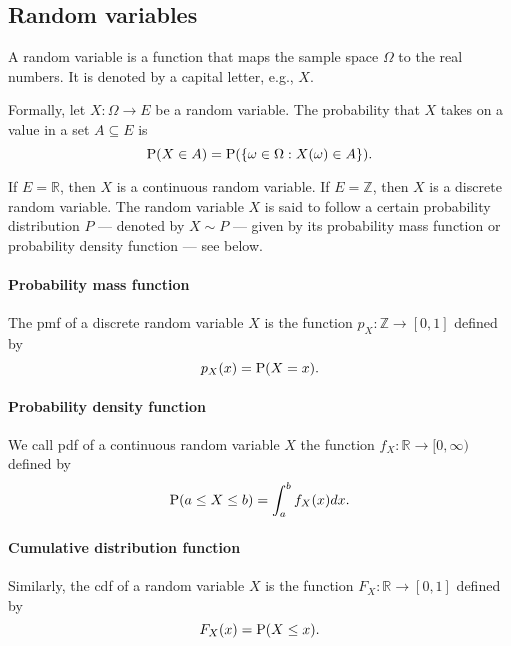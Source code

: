 \subsection{Random variables}

A random variable is a function that maps the sample space $\Omega$ to the real
numbers.  It is denoted by a capital letter, e.g., $X$.

Formally, let $X : \Omega \rightarrow E$ be a random variable.  The
probability that $X$ takes on a value in a set $A \subseteq E$ is
\begin{equation}
  \label{eq:rv}
  \operatorname{P}(X \in A) = \operatorname{P}(\{\omega \in \Omega : X(\omega) \in A\})\text{.}
\end{equation}

If $E = \mathbb{R}$, then $X$ is a continuous random variable.  If $E = \mathbb{Z}$,
then $X$ is a discrete random variable.  The random variable $X$ is said to follow
a certain probability distribution $P$ --- denoted by $X \sim P$ --- given by its
probability mass function or probability density function --- see below.

\paragraph{Probability mass function}

The \gls{pmf} of a discrete random variable $X$ is the
function $p_X : \mathbb{Z} \rightarrow [0, 1]$ defined by
\begin{equation}
  \label{eq:pmf}
  p_X(x) = \operatorname{P}(X = x)\text{.}
\end{equation}

\paragraph{Probability density function}

We call \gls{pdf} of a continuous random variable $X$ the
function $f_X : \mathbb{R} \rightarrow [0, \infty)$ defined by
\begin{equation}
  \label{eq:pdf}
  \operatorname{P}(a \leq X \leq b) = \int_a^b f_X(x) dx\text{.}
\end{equation}

\paragraph{Cumulative distribution function}

Similarly, the \gls{cdf} of a random variable $X$ is the function
$F_X : \mathbb{R} \rightarrow [0, 1]$ defined by
\begin{equation}
  \label{eq:cdf}
  F_X(x) = \operatorname{P}(X \leq x)\text{.}
\end{equation}

